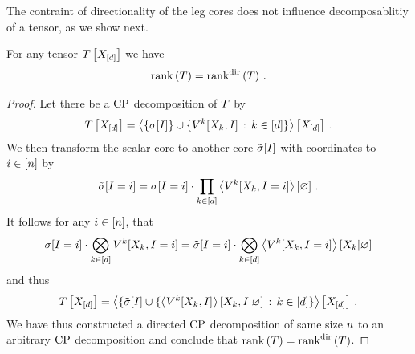 The contraint of directionality of the leg cores does not influence decomposablitiy of a tensor, as we show next.

\begin{lemma}\label{lem:cprankEqualsDir}
    For any tensor $T\left[X_{[d]}\right]$ we have
    \begin{align*}
        \mathrm{rank}\left(T\right) = \mathrm{rank}^{\mathrm{dir}}\left(T\right) \, .
    \end{align*}
\end{lemma}
\begin{proof}
    Let there be a $\mathrm{CP}$ decomposition of $T$ by
    \begin{align*}
        T\left[X_{[d]}\right]
        = \left\langle 
            \{\sigma[I]\} \cup \{ V^{k}[X_{k},I] \, : \, k\in[d] \}
        \right\rangle \left[ X_{[d]} \right] \, .
    \end{align*}
    We then transform the scalar core to another core $\tilde{\sigma}[I]$ with coordinates to $i\in[n]$ by
    \begin{align*}
        \tilde{\sigma}[I=i]
        = \sigma[I=i] \cdot \prod_{k\in[d]} \left\langle V^{k}[X_{k},I=i]\right\rangle \left[ \varnothing \right] \, .
    \end{align*}
    It follows for any $i\in[n]$, that
    \begin{align*}
        \sigma[I=i] \cdot \bigotimes_{k\in[d]}V^{k}[X_{k},I=i]
        = \tilde{\sigma}[I=i] \cdot \bigotimes_{k\in[d]}\left\langle V^{k}[X_{k},I=i]\right\rangle \left[ X_{k} | \varnothing \right]
    \end{align*}
    and thus
    \begin{align*}
        T\left[X_{[d]}\right]
        = \left\langle 
            \{\tilde{\sigma}[I] \cup \{ \left\langle V^{k}[X_{k},I]\right\rangle \left[ X_{k},I | \varnothing \right] \, : \, k\in[d] \}
        \right\rangle \left[ X_{[d]} \right] \, .
    \end{align*}
    We have thus constructed a directed $\mathrm{CP}$ decomposition of same size $n$ to an arbitrary $\mathrm{CP}$ decomposition and conclude that $\mathrm{rank}\left(T\right) = \mathrm{rank}^{\mathrm{dir}}\left(T\right)$.
\end{proof}

